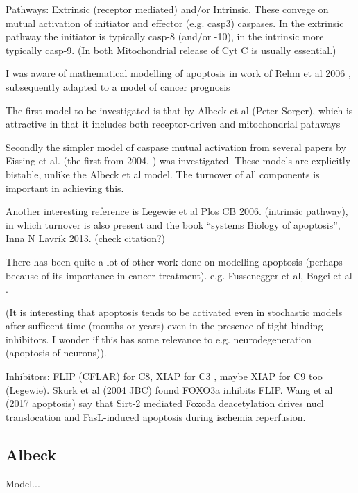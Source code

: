 \documentclass[a4paper,10pt]{report}
\begin{document}
Pathways: Extrinsic (receptor mediated) and/or Intrinsic. 
These convege on mutual activation of initiator and effector (e.g. casp3) caspases. In the extrinsic pathway the initiator is typically casp-8 (and/or -10), in the intrinsic more typically casp-9. (In both Mitochondrial release of Cyt C is usually essential.)

I was aware of mathematical modelling of apoptosis in work of Rehm et al 2006 \cite{rehm2006systems}, subsequently adapted to a model of cancer prognosis \cite{hector2009apoptosis}

The first model to be investigated is that by Albeck et al (Peter Sorger), which is attractive in that it includes both receptor-driven and mitochondrial pathways \cite{albeck2008quantitative}

Secondly the simpler model of caspase mutual activation from several papers by Eissing et al. (the first from 2004, \cite{eissing2004bistability}) was investigated. These models are explicitly bistable, unlike the Albeck et al model. The turnover of all components is important in achieving this. 

Another interesting reference is Legewie et al Plos CB 2006. (intrinsic pathway), in which turnover is also present \cite{legewie2006mathematical}
and the book ``systems Biology of apoptosis'', Inna N Lavrik 2013.
\cite{lavrik2010systems} (check citation?)

There has been quite a lot of other work done on modelling apoptosis (perhaps because of its importance in cancer treatment). e.g. Fussenegger et al, Bagci et al \cite{bagci2006bistability}.
 
(It is interesting that apoptosis tends to be activated even in stochastic models after sufficent time (months or years)  even in the presence of tight-binding inhibitors. I wonder if this has some relevance to e.g. neurodegeneration (apoptosis of neurons)). 

Inhibitors: FLIP (CFLAR) for C8, XIAP for C3 , maybe XIAP for C9 too (Legewie).
Skurk et al (2004 JBC) found FOXO3a inhibits FLIP. Wang et al (2017 apoptosis) say that Sirt-2 mediated Foxo3a deacetylation drives nucl translocation and FasL-induced apoptosis during ischemia reperfusion.

\subsection{Albeck}

Model...\cite{albeck2008quantitative}
\end{document}
